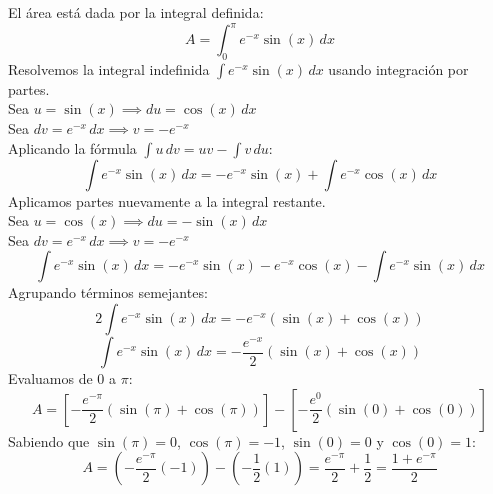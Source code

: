 \documentclass[11pt,paper=a4,answers, addpoints]{exam}
\begin{document}
\begin{questions}
\begin{solution}
El área está dada por la integral definida:
\[ A = \int_0^\pi e^{-x}\sin(x) \, dx \]
Resolvemos la integral indefinida $\int e^{-x}\sin(x) \, dx$ usando integración por partes. \\
Sea $u = \sin(x) \implies du = \cos(x) \, dx$ \\
Sea $dv = e^{-x} \, dx \implies v = -e^{-x}$ \\
Aplicando la fórmula $\int u \, dv = uv - \int v \, du$:
\[ \int e^{-x}\sin(x) \, dx = -e^{-x}\sin(x) + \int e^{-x}\cos(x) \, dx \]
Aplicamos partes nuevamente a la integral restante. \\
Sea $u = \cos(x) \implies du = -\sin(x) \, dx$ \\
Sea $dv = e^{-x} \, dx \implies v = -e^{-x}$
\[ \int e^{-x}\sin(x) \, dx = -e^{-x}\sin(x) - e^{-x}\cos(x) - \int e^{-x}\sin(x) \, dx \]
Agrupando términos semejantes:
\[ 2 \int e^{-x}\sin(x) \, dx = -e^{-x}(\sin(x) + \cos(x)) \]
\[ \int e^{-x}\sin(x) \, dx = -\frac{e^{-x}}{2}(\sin(x) + \cos(x)) \]
Evaluamos de $0$ a $\pi$:
\[ A = \left[ -\frac{e^{-\pi}}{2}(\sin(\pi) + \cos(\pi)) \right] - \left[ -\frac{e^{0}}{2}(\sin(0) + \cos(0)) \right] \]
Sabiendo que $\sin(\pi) = 0$, $\cos(\pi) = -1$, $\sin(0) = 0$ y $\cos(0) = 1$:
\[ A = \left( -\frac{e^{-\pi}}{2}(-1) \right) - \left( -\frac{1}{2}(1) \right) = \frac{e^{-\pi}}{2} + \frac{1}{2} = \frac{1 + e^{-\pi}}{2} \]
\end{solution}

\end{questions}
\end{document}
